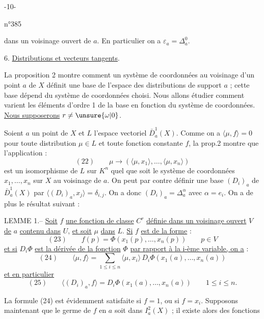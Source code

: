 \begin{center}-10-\end{center}
\begin{flushright}n°385\end{flushright}
dans un voisinage ouvert de $a$. En particulier on a $\varepsilon_a=\Delta_a^0$.

6. \uline{Distributions et vecteurs tangents}.

La proposition 2 montre comment un système de coordonnées au voisinage d'un point $a$ de $X$ définit une base de l'espace des distributions de support $a$ ; cette base dépend du système de coordonnées choisi. Nous allons étudier comment varient les éléments d'ordre 1 de la base en fonction du système de coordonnées. \uline{Nous supposerons} $r\neq\unsure{\omega|0}$.

Soient $a$ un point de $X$ et $L$ l'espace vectoriel $\bar D_a^1(X)$. Comme on a $\langle\mu,f\rangle=0$ pour toute distribution $\mu\in L$ et toute fonction constante $f$, la prop.2 montre que l'application :
\[
(22)\qquad \mu\longrightarrow(\langle\mu,x_1\rangle,\ldots,\langle\mu,x_n\rangle)
\]
est un isomorphisme de $L$ sur $K^n$ quel que soit le système de coordonnées $x_1,\ldots,x_n$ sur $X$ au voisinage de $a$. On peut par contre définir une base $(D_i)_a$ de $\bar D_a^1(X)$ par $\langle(D_i)_a,x_j\rangle=\delta_{i,j}$. On a donc $(D_i)_a=\Delta_a^\alpha$ avec $\alpha=e_i$. On a de plus le résultat suivant :

LEMME 1.-- \uline{Soit} $f$ \uline{une fonction de classe} $C^r$ \uline{définie dans un voisinage ouvert} $V$ \uline{de} $a$ \uline{contenu dans} $U$, \uline{et soit} $\mu$ \uline{dans} $L$. \uline{Si} $f$ \uline{est de la forme} :
\[
(23)\qquad f(p)=\Phi(x_1(p),\ldots,x_n(p))
\qquad p\in V
\]
\uline{et si} $D_i\Phi$ \uline{est la dérivée de la fonction} $\Phi$ \uline{par rapport à la i-ème variable, on a} :
\[
(24)\qquad
\langle\mu,f\rangle=\sum_{1\leq i\leq n}\langle\mu,x_i\rangle\,D_i\Phi(x_1(a),\ldots,x_n(a))
\]
\uline{et en particulier}
\[
(25)\qquad
\langle(D_i)_a,f\rangle=D_i\Phi(x_1(a),\ldots,x_n(a))
\qquad 1\leq i\leq n.
\]

La formule (24) est évidemment satisfaite si $f=1$, ou si $f=x_i$. Supposons maintenant que le germe de $f$ en $a$ soit dans $I_a^2(X)$ ; il existe alors des fonctions
